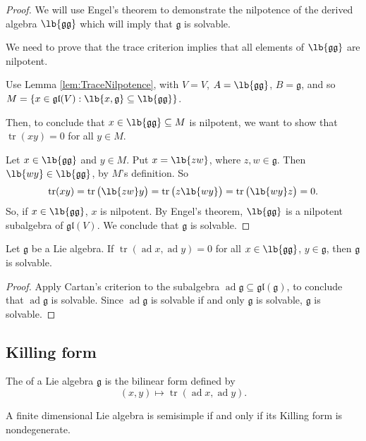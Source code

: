 \documentclass{article}
\DeclarePairedDelimiter\lb\lbrack\rbrack
\DeclareMathOperator{\tr}{tr}
\DeclareMathOperator{\ad}{ad}
\newcommand*\frkg{{\ensuremath{\mathfrak{g}}}}
\newcommand*\gl{\ensuremath{\mathfrak{gl}}}
\begin{document}
\begin{proof}
    We will use Engel's theorem to demonstrate the nilpotence of the derived algebra $\lb{\frkg\frkg}$ which will imply that $\frkg$ is solvable.

    We need to prove that the trace criterion implies that all elements of $\lb{\frkg\frkg}$ are nilpotent.

    Use Lemma \ref{lem:TraceNilpotence}, with $V = V$, $A = \lb{\frkg\frkg}$, $B = \frkg$, and so $M = \{x \in \gl(V): \lb{x,\frkg} \subseteq \lb{\frkg\frkg}\}$.

    Then, to conclude that $x \in \lb{\frkg\frkg} \subseteq M$ is nilpotent, we want to show that $\tr(xy) = 0$ for all $y \in M$.

    Let $x \in \lb{\frkg\frkg}$ and $y \in M$.
    Put $x = \lb{zw}$, where $z,w \in \frkg$.
    Then $\lb{wy} \in \lb{\frkg\frkg}$, by $M$'s definition.
    So
    \[
        \tr(xy)
        =
        \tr\big(\lb{zw}y\big)
        =
        \tr\big(z\lb{wy}\big)
        =
        \tr\big(\lb{wy}z\big)
        =
        0.
    \]
    So, if $x \in \lb{\frkg\frkg}$, $x$ is nilpotent.
    By Engel's theorem, $\lb{\frkg\frkg}$ is a nilpotent subalgebra of $\gl(V)$.
    We conclude that $\frkg$ is solvable.
\end{proof}

\begin{corollary}
    Let $\frkg$ be a Lie algebra.
    If $\tr(\ad x, \ad y) = 0$ for all $x \in \lb{\frkg\frkg}$, $y \in \frkg$, then $\frkg$ is solvable.
\end{corollary}

\begin{proof}
    Apply Cartan's criterion to the subalgebra $\ad \frkg \subseteq \gl(\frkg)$, to conclude that $\ad \frkg$ is solvable.
    Since $\ad \frkg$ is solvable if and only $\frkg$ is solvable, $\frkg$ is solvable.
\end{proof}

\subsection{Killing form}

\begin{definition}
    The  of a Lie algebra $\frkg$ is the bilinear form defined by
    \[
        (x, y)
        \mapsto
        \tr(\ad x, \ad y).
    \]
\end{definition}

\begin{proposition}
    A finite dimensional Lie algebra is semisimple if and only if its Killing form is nondegenerate.
\end{proposition}
\end{document}

